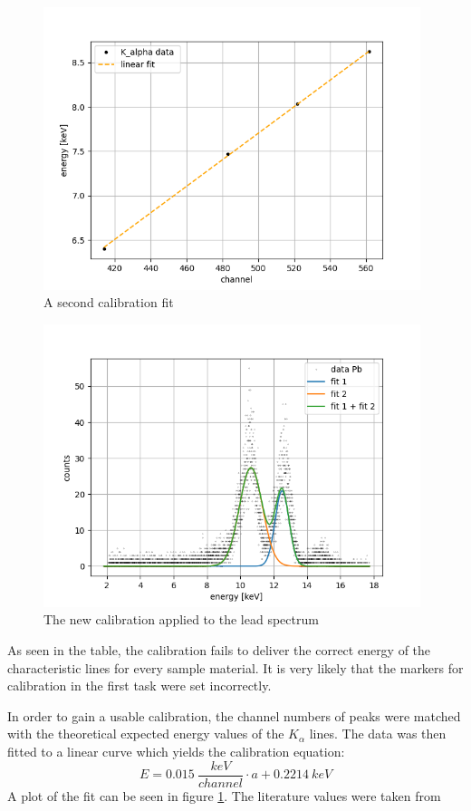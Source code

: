 \begin{figure}[]

    \centering
    \includegraphics[width=110mm,scale=0.5]{MAX/include/K_alpha.png}
    \caption{A second calibration fit}
    \label{figure:Kalpha fit}
\end{figure}
\begin{figure}[]


    \centering
    \includegraphics[width=110mm,scale=0.5]{MAX/include/plotsPb2.png}
    \caption{The new calibration applied to the lead spectrum}
    \label{figure:lead comp}
\end{figure}
As seen in the table, the calibration fails to deliver the correct energy of the characteristic lines for every sample material. It is very likely that the markers for calibration in the first task were set incorrectly.

In order to gain a usable calibration, the channel numbers of peaks were matched with the theoretical expected energy values of the $K_{\alpha}$ lines. The data was then fitted to a linear curve which yields the calibration equation: $$ E = \SI{0.015}{\frac{keV}{channel}} \cdot a + \SI{0.2214}{keV}$$
A plot of the fit can be seen in figure \ref{figure:Kalpha fit}. The literature values were taken from \cite{Xraylines}


